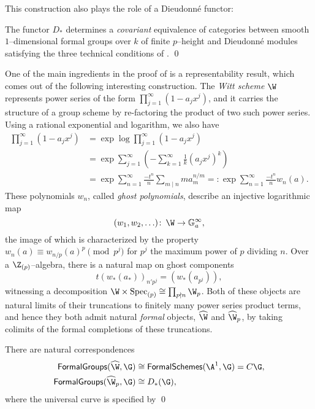 This construction also plays the role of a Dieudonn\'e functor:

\begin{theorem}\label{CurveDieudonneTheorem}
The functor $D_*$ determines a \emph{covariant} equivalence of categories between smooth $1$--dimensional formal groups over $k$ of finite $p$--height and Dieudonn\'e modules satisfying the three technical conditions of . \qed
\end{theorem}

One of the main ingredients in the proof of  is a representability result, which comes out of the following interesting construction.  The \textit{Witt scheme} $\W$ represents power series of the form $\prod_{j=1}^\infty (1 - a_j x^j)$, and it carries the structure of a group scheme by re-factoring the product of two such power series.  Using a rational exponential and logarithm, we also have
\begin{align*}
\prod_{j=1}^\infty (1 - a_j x^j) & = \exp \log \prod_{j=1}^\infty (1 - a_j x^j) \\
& = \exp \sum_{j=1}^\infty \left(-\sum_{k=1}^\infty \frac{1}{k} (a_j x^j)^k\right) \\
& = \exp \sum_{n=1}^\infty \frac{-t^n}{n} \sum_{m \mid n} m a_m^{n/m} =: \exp \sum_{n=1}^\infty \frac{-t^n}{n} w_n(a).
\end{align*}
These polynomials $w_n$, called \textit{ghost polynomials}, describe an injective logarithmic map \[(w_1, w_2, \ldots) \co \W \to \Ga^\infty,\] the image of which is characterized by the property $w_n(a) \equiv w_{n/p}(a)^p \pmod{p^j}$ for $p^j$ the maximum power of $p$ dividing $n$.  Over a $\Z_{(p)}$--algebra, there is a natural map on ghost components \[t(w_*(a_*))_{n'p^j} = (w_*(a_{p^j})),\] witnessing a decomposition $\W \times \Spec_{(p)} \cong \prod_{p \nmid n} \W_p$.  Both of these objects are natural limits of their truncations to finitely many power series product terms, and hence they both admit natural \emph{formal} objects, $\widehat{\W}$ and $\widehat{\W}_p$, by taking colimits of the formal completions of these truncations.

\begin{lemma}
There are natural correspondences
\begin{align*}
\CatOf{FormalGroups}(\widehat{\W}, \G) & \cong \CatOf{FormalSchemes}(\A^1, \G) = C\G, \\
\CatOf{FormalGroups}(\widehat{\W}_p, \G) & \cong D_*(\G),
\end{align*}
where the universal curve is specified by  \qed
\end{lemma}


